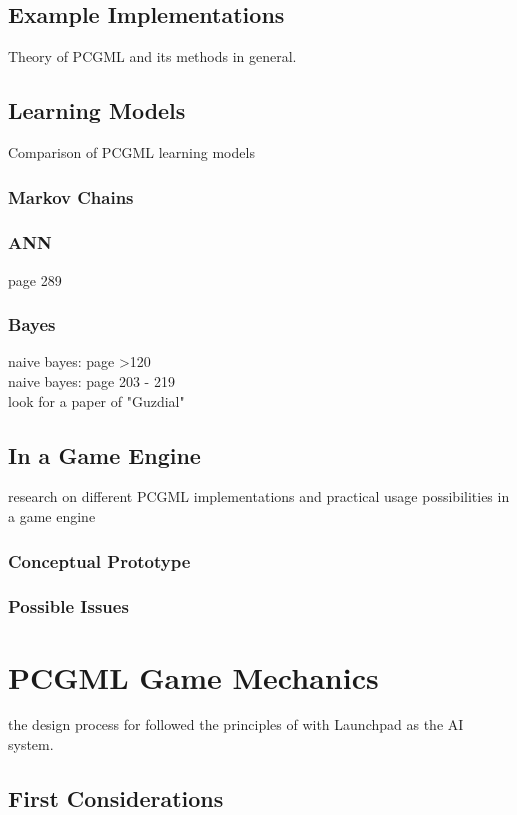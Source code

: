 \documentclass[MGS,Master,english]{twbook}%
\begin{document}
\section{Example Implementations}
Theory of PCGML and its methods in general.
\section{Learning Models}
Comparison of PCGML learning models
\subsection{Markov Chains}
\subsection{\acl{ANN}}
\cite{ml::book::algorithms} page 289
\subsection{Bayes}
\cite{ml::book::algorithms} naive bayes: page >120\\
\cite{ml::book::statistics} naive bayes: page 203 - 219\\
look for a paper of "Guzdial"
\section{In a Game Engine}
research on different PCGML implementations and practical usage possibilities in a game engine
\subsection{Conceptual Prototype}
\subsection{Possible Issues}
%
%
\clearpage
\chapter{\acl{PCGML} Game Mechanics}
the design process for \cite{pcg::endlessWeb} followed the principles of \cite{ai::gameDesign} with Launchpad as the AI system.

\section{First Considerations}
\end{document}
